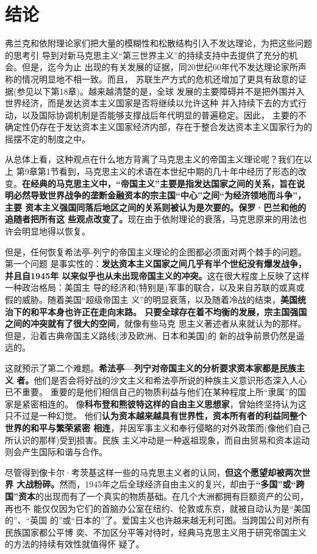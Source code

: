 \section{结论}

弗兰克和依附理论家们把大量的模糊性和松散结构引入不发达理论，为把这些问题的思考引
导到对新马克思主义“第三世界主义”的持续支持中去提供了充分的机会。但是，迄今为止
出现的有关发展的证据，同20世纪60年代不发达理论家所声称的情况明显地不相一致。而且，
苏联生产方式的危机还增加了更具有敌意的证据(参见以下第18章)。越来越清楚的是，全球
发展的主要障碍并不是把外围并入世界经济，而是发达资本主义国家是否将继续以允许这种
并入持续下去的方式行动，以及国际协调机制是否能够支撑战后年代明显的普遍稳定。因此，
主要的不确定性仍存在于发达资本主义国家经济内部，存在于整合发达资本主义国家行为的
摇摆不定的制度之中。

从总体上看，这种观点在什么地方背离了马克思主义的帝国主义理论呢？我们在以上
第9章第1节看到，马克思主义的术语在本世纪中期的几十年中经历了形态的改
变。\textbf{在经典的马克思主义中，“帝国主义”主要是指发达国家之间的关系，旨在说
  明必然导致世界战争的垄断金融资本的宗主国“中心”之间“为经济领地而斗争”，主要
  资本主义强国同落后地区之间的关系则被认为是次要的。保罗·巴兰和他的追随者把所有这
  些观点改变了。}现在由于依附理论的衰落，马克思原来的用法也许会明显地得以恢复。

但是，任何恢复希法亭-列宁的帝国主义理论的企图都必须面对两个棘手的问题。第一个问题
是事实性的：\textbf{发达资本主义国家之间几乎有半个世纪没有爆发战争，并且自1945年
  以来似乎也从未出现帝国主义的冲突。}这在很大程度上反映了这样一种政治格局：美国主
导的经济和(特别是)军事的联合，以及来自苏联的或真或假的威胁。随着美国“超级帝国主
义”的明显衰落，以及随着冷战的结束，\textbf{美国统治下的和平本身也许正在走向末路。
  只要全球存在着不均衡的发展，宗主国强国之间的冲突就有了很大的空间}，就像有些马克
思主义著述者从来就认为的那样。但是，沿着古典帝国主义路线(涉及欧洲、日本和美国)的
新的战争前景仍然是遥远的。

这就预示了第二个难题。\textbf{希法亭—列宁对帝国主义的分析要求资本家都是民族主义
  者。}他们是否会将好战的沙文主义和希法亭所说的种族主义意识形态深入人心已不重要。
重要的是他们相信自己的物质利益与他们在某种程度上所“隶属”的国家是紧密相连的。
像\textbf{科布登和熊彼特这样的自由主义思想家}，曾始终坚持认为这只不过是一种幻觉。
他们\textbf{认为资本越来越具有世界性，资本所有者的利益同整个世界的和平与繁荣紧密
  相连}，并因军事主义和奉行侵略的对外政策而(像他们自己所认识的那样)受到损害。民族
主义冲动是一种返祖现象，而自由贸易和资本运动则会产生国际和谐与合作。

尽管得到像卡尔·考茨基这样一些的马克思主义者的认同，\textbf{但这个愿望却被两次世界
  大战粉碎。}然而，1945年之后全球经济自由主义的复兴，却由于\textbf{“多国”或“跨
  国”资本}的出现而有了一个真实的物质基础。在几个大洲都拥有巨额资产的公司，再也不
能仅仅因为它们的首脑办公室在纽约、伦敦或东京，就被自动认为是“美国的”、“英国
的”或“日本的”了。爱国主义也许越来越无利可图。当跨国公司对所有民族国家都公平博
奕、不加区分平等对待时，经典马克思主义用于研究帝国主义的方法的持续有效性就值得怀
疑了。


